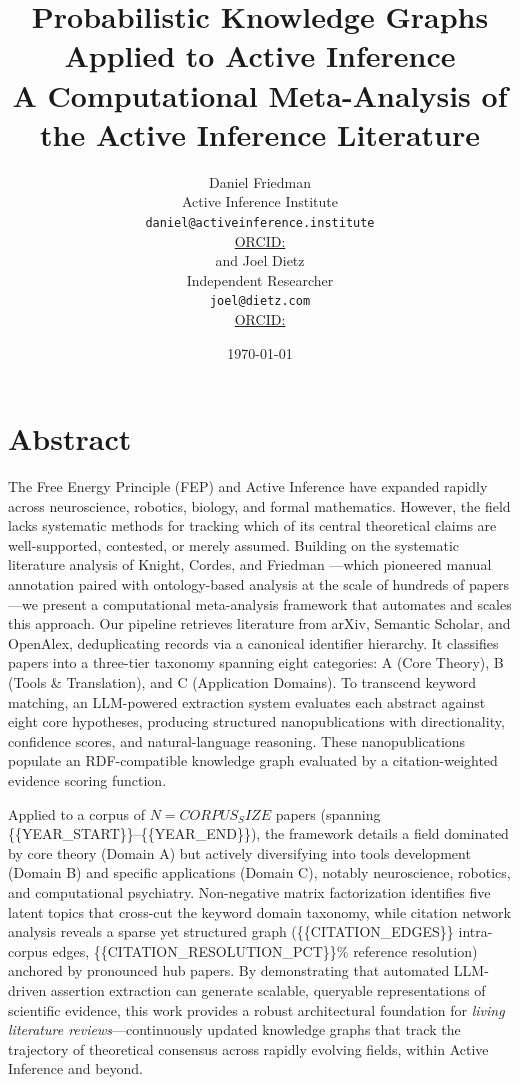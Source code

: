 \documentclass[
]{article}
\author{}
\date{}
\title{Probabilistic Knowledge Graphs Applied to Active Inference\\\normalsize A Computational Meta-Analysis of the Active Inference Literature}
\author{Daniel Friedman\\\footnotesize{Active Inference Institute}\\\footnotesize{\texttt{daniel@activeinference.institute}}\\\footnotesize{\href{https://orcid.org/}{ORCID: }} \\and Joel Dietz\\\footnotesize{Independent Researcher}\\\footnotesize{\texttt{joel@dietz.com}}\\\footnotesize{\href{https://orcid.org/}{ORCID: }}}
\date{\today}
\begin{document}
\maketitle
\thispagestyle{empty}


\section{Abstract}\label{abstract}

The Free Energy Principle (FEP) and Active Inference have expanded
rapidly across neuroscience, robotics, biology, and formal mathematics.
However, the field lacks systematic methods for tracking which of its
central theoretical claims are well-supported, contested, or merely
assumed. Building on the systematic literature analysis of Knight,
Cordes, and Friedman \citep{knight2022fep}---which pioneered manual
annotation paired with ontology-based analysis at the scale of hundreds
of papers---we present a computational meta-analysis framework that
automates and scales this approach. Our pipeline retrieves literature
from arXiv, Semantic Scholar, and OpenAlex, deduplicating records via a
canonical identifier hierarchy. It classifies papers into a three-tier
taxonomy spanning eight categories: A (Core Theory), B (Tools \&
Translation), and C (Application Domains). To transcend keyword
matching, an LLM-powered extraction system evaluates each abstract
against eight core hypotheses, producing structured nanopublications
with directionality, confidence scores, and natural-language reasoning.
These nanopublications populate an RDF-compatible knowledge graph
evaluated by a citation-weighted evidence scoring function.

Applied to a corpus of \(N = {{CORPUS_SIZE}}\) papers (spanning
\{\{YEAR\_START\}\}--\{\{YEAR\_END\}\}), the framework details a field
dominated by core theory (Domain A) but actively diversifying into tools
development (Domain B) and specific applications (Domain C), notably
neuroscience, robotics, and computational psychiatry. Non-negative
matrix factorization identifies five latent topics that cross-cut the
keyword domain taxonomy, while citation network analysis reveals a
sparse yet structured graph (\{\{CITATION\_EDGES\}\} intra-corpus edges,
\{\{CITATION\_RESOLUTION\_PCT\}\}\% reference resolution) anchored by
pronounced hub papers. By demonstrating that automated LLM-driven
assertion extraction can generate scalable, queryable representations of
scientific evidence, this work provides a robust architectural
foundation for \emph{living literature reviews}---continuously updated
knowledge graphs that track the trajectory of theoretical consensus
across rapidly evolving fields, within Active Inference and beyond.
\end{document}
